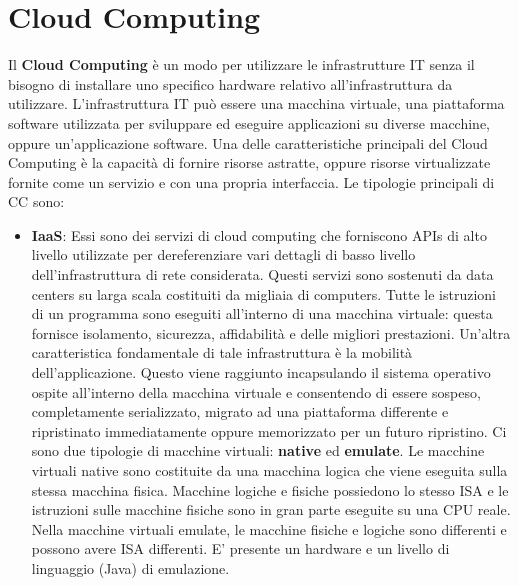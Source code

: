 \chapter{Cloud Computing}
Il \textbf{Cloud Computing} è un modo per utilizzare le infrastrutture IT senza il bisogno di installare uno specifico hardware relativo all'infrastruttura da utilizzare. L'infrastruttura IT può essere una macchina virtuale, una piattaforma software utilizzata per sviluppare ed eseguire applicazioni su diverse macchine, oppure un'applicazione software. Una delle caratteristiche principali del Cloud Computing è la capacità di fornire risorse astratte, oppure risorse virtualizzate fornite come un servizio e con una propria interfaccia. Le tipologie principali di CC sono:
\begin{itemize}
\item \textbf{IaaS}: Essi sono dei servizi di cloud computing che forniscono APIs di alto livello utilizzate per dereferenziare vari dettagli di basso livello dell'infrastruttura di rete considerata. Questi servizi sono sostenuti da data centers su larga scala costituiti da migliaia di computers. Tutte le istruzioni di un programma sono eseguiti all'interno di una macchina virtuale: questa fornisce isolamento, sicurezza, affidabilità e delle migliori prestazioni. Un'altra caratteristica fondamentale di tale infrastruttura è la mobilità dell'applicazione. Questo viene raggiunto incapsulando il sistema operativo ospite all'interno della macchina virtuale e consentendo di essere sospeso, completamente serializzato, migrato ad una piattaforma differente e ripristinato immediatamente oppure memorizzato per un futuro ripristino. Ci sono due tipologie di macchine virtuali: \textbf{native} ed \textbf{emulate}. Le macchine virtuali native sono costituite da una macchina logica che viene eseguita sulla stessa macchina fisica. Macchine logiche e fisiche possiedono lo stesso ISA e le istruzioni sulle macchine fisiche sono in gran parte eseguite su una CPU reale. Nella macchine virtuali emulate, le macchine fisiche e logiche sono differenti e possono avere ISA differenti. E' presente un hardware e un livello di linguaggio (Java) di emulazione.

\end{itemize}
